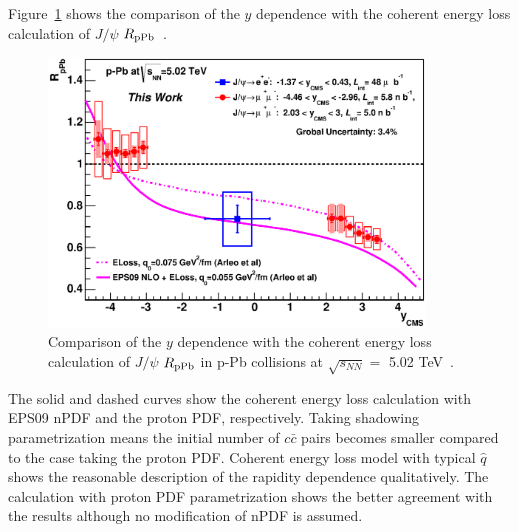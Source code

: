 Figure~\ref{fig_5_rppbyvseloss} shows the comparison of the $y$ dependence with the coherent energy loss calculation of $J/\psi$ $R_{\rm{pPb}}$~\cite{bib_jpsipaeloss}.
\begin{figure}[!h]
  \centering
  \includegraphics[width=10cm]{chap5/figure/ModelComp/JpsiRpPb_eloss_y.eps}
  \caption{Comparison of the $y$ dependence with the coherent energy loss calculation of $J/\psi$ $R_{\rm{pPb}}$ in p-Pb collisions at $\sqrt{s_{NN}}=$ 5.02 TeV~\cite{bib_jpsipaeloss}.}
  \label{fig_5_rppbyvseloss}
\end{figure}
The solid and dashed curves show the coherent energy loss calculation with EPS09 nPDF and the proton PDF, respectively.
Taking shadowing parametrization means the initial number of $c\bar{c}$ pairs becomes smaller compared to the case taking the proton PDF. 
Coherent energy loss model with typical $\hat{q}$ shows the reasonable description of the rapidity dependence qualitatively. 
The calculation with proton PDF parametrization shows the better agreement with the results although no modification of nPDF is assumed.  

